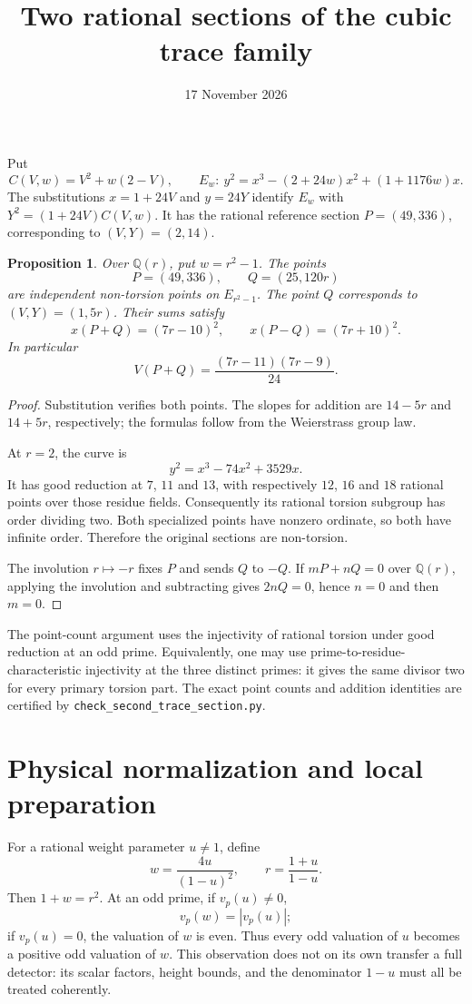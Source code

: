 \documentclass[11pt,a4paper]{article}
\title{Two rational sections of the cubic trace family}
\author{}\date{17 November 2026}
\newtheorem{proposition}{Proposition}
\newcommand{\Q}{\mathbb Q}
\begin{document}
\maketitle

Put
\[
 C(V,w)=V^2+w(2-V),\qquad
 E_w:\ y^2=x^3-(2+24w)x^2+(1+1176w)x.
\]
The substitutions $x=1+24V$ and $y=24Y$ identify $E_w$ with
$Y^2=(1+24V)C(V,w)$. It has the rational reference section
$P=(49,336)$, corresponding to $(V,Y)=(2,14)$.

\begin{proposition}\label{prop:sections}
Over $\Q(r)$, put $w=r^2-1$. The points
\[
                 P=(49,336),\qquad Q=(25,120r)
\]
are independent non-torsion points on $E_{r^2-1}$. The point $Q$
corresponds to $(V,Y)=(1,5r)$. Their sums satisfy
\[
 x(P+Q)=(7r-10)^2,\qquad x(P-Q)=(7r+10)^2.
\]
In particular
\[
 V(P+Q)=\frac{(7r-11)(7r-9)}{24}.
\]
\end{proposition}
\begin{proof}
Substitution verifies both points. The slopes for addition are
$14-5r$ and $14+5r$, respectively; the formulas follow from
the Weierstrass group law.

At $r=2$, the curve is
\[
                 y^2=x^3-74x^2+3529x.
\]
It has good reduction at $7$, $11$ and $13$, with respectively
$12$, $16$ and $18$ rational points over those residue fields.
Consequently its rational torsion subgroup has order dividing two.
Both specialized points have nonzero ordinate, so both have infinite
order. Therefore the original sections are non-torsion.

The involution $r\mapsto-r$ fixes $P$ and sends $Q$ to $-Q$.
If $mP+nQ=0$ over $\Q(r)$, applying the involution and subtracting
gives $2nQ=0$, hence $n=0$ and then $m=0$.
\end{proof}

The point-count argument uses the injectivity of rational torsion
under good reduction at an odd prime. Equivalently, one may use
prime-to-residue-characteristic injectivity at the three distinct
primes: it gives the same divisor two for every primary torsion part.
The exact point counts and addition identities are certified by
\texttt{check\_second\_trace\_section.py}.

\section*{Physical normalization and local preparation}

For a rational weight parameter $u\ne1$, define
\[
             w=\frac{4u}{(1-u)^2},\qquad
             r=\frac{1+u}{1-u}.
\]
Then $1+w=r^2$. At an odd prime, if $v_p(u)\ne0$,
\[
                         v_p(w)=|v_p(u)|;
\]
if $v_p(u)=0$, the valuation of $w$ is even. Thus every odd
valuation of $u$ becomes a positive odd valuation of $w$.
This observation does not on its own transfer a full detector:
its scalar factors, height bounds, and the denominator $1-u$
must all be treated coherently.
\end{document}
